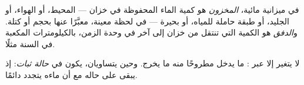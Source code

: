 \begin{definition}\label{def:g10:freshwater-resources:stock}
في ميزانية مائية، \emph{المخزون} هو كمية الماء
المحفوظة في خزان --- المحيط، أو الهواء، أو الجليد، أو طبقة حاملة للمياه، أو بحيرة
--- في لحظة معينة، معبَّرًا عنها بحجم أو كتلة.
و\emph{الدفق} هو الكمية التي تنتقل من خزان إلى آخر في وحدة
الزمن، بالكيلومترات المكعبة في السنة مثلًا.
\end{definition}

لا يتغير  إلا عبر : ما يدخل مطروحًا منه ما يخرج. وحين يتساويان، يكون
 في \emph{حالة ثبات}: إذ يبقى على حاله مع أن ماءه
يتجدد دائمًا.

